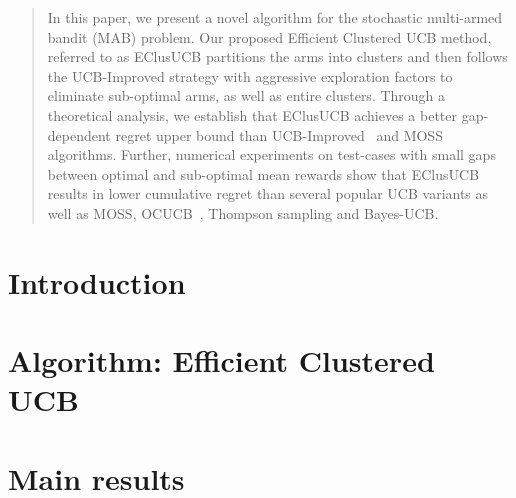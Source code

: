 \documentclass{article}
\begin{document}
\printAffiliationsAndNotice{}  %

\begin{abstract}
In this paper, we present a novel algorithm for the stochastic multi-armed bandit (MAB) problem. Our proposed Efficient Clustered UCB method, referred to as EClusUCB partitions the arms into clusters and then follows the UCB-Improved strategy with aggressive exploration factors to eliminate sub-optimal arms, as well as entire clusters. Through a theoretical analysis, we establish that EClusUCB achieves a better gap-dependent regret upper bound than UCB-Improved~\cite{auer2010ucb} and MOSS~\cite{audibert2009minimax} algorithms. Further, numerical experiments on test-cases with small gaps between optimal and sub-optimal mean rewards show that EClusUCB results in lower cumulative regret than several popular UCB variants as well as MOSS, OCUCB~\cite{lattimore2015optimally}, Thompson sampling and Bayes-UCB\cite{kaufmann2012bayesian}. 

\end{abstract}
\section{Introduction}
\label{sec:intro}

%
%
%
\section{Algorithm: Efficient Clustered UCB}
\label{sec:eclusucb}
\vspace*{-0.7em}

\vspace*{-1.6em}
\section{Main results}
\label{sec:results}

\vspace*{-1.4em}
\end{document}
